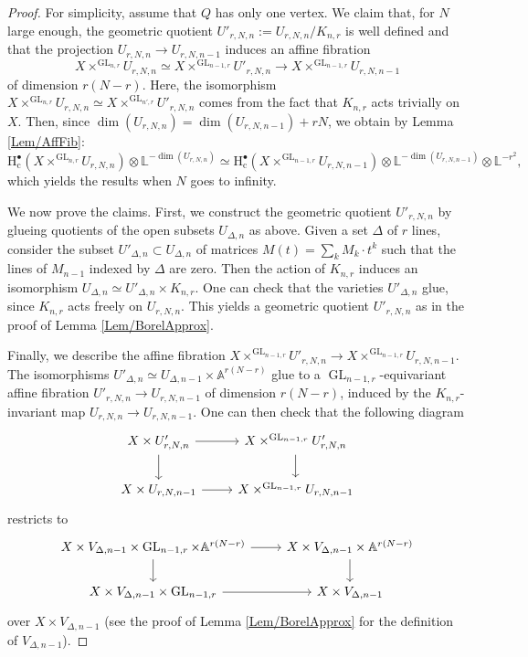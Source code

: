 \documentclass[11pt,english]{article}
\numberwithin{equation}{section}
\numberwithin{figure}{section}
\theoremstyle{definition}
\theoremstyle{plain}
\theoremstyle{remark}
\DeclareMathOperator{\GL}{GL}
\newcommand\HH{\mathrm{H}}
\begin{document}
\begin{proof}

For simplicity, assume that $Q$ has only one vertex. We claim that,
for $N$ large enough, the geometric quotient $U'_{r,N,n}:=U_{r,N,n}/K_{n,r}$
is well defined and that the projection $U_{r,N,n}\rightarrow U_{r,N,n-1}$
induces an affine fibration \[
X\times^{\GL_{n,r}}U_{r,N,n}\simeq X\times^{\GL_{n-1,r}}U'_{r,N,n}\rightarrow X\times^{\GL_{n-1,r}}U_{r,N,n-1}
\] of dimension $r(N-r)$. Here, the isomorphism $X\times^{\GL_{n,r}}U_{r,N,n}\simeq X\times^{\GL_{n',r}}U'_{r,N,n}$
comes from the fact that $K_{n,r}$ acts trivially on $X$. Then,
since $\dim(U_{r,N,n})=\dim(U_{r,N,n-1})+rN$, we obtain by Lemma
\ref{Lem/AffFib}:\[
\HH_{\mathrm{c}}^{\bullet}(X\times^{\GL_{n,r}}U_{r,N,n})
\otimes \mathbb{L}^{-\dim(U_{r,N,n})}
\simeq
\HH_{\mathrm{c}}^{\bullet}(X\times^{\GL_{n-1,r}}U_{r,N,n-1})
\otimes \mathbb{L}^{-\dim(U_{r,N,n-1})} \otimes \mathbb{L}^{-r^2},
\] which yields the results when $N$ goes to infinity.

We now prove the claims. First, we construct the geometric quotient
$U'_{r,N,n}$ by glueing quotients of the open subsets $U_{\Delta,n}$
as above. Given a set $\Delta$ of $r$ lines, consider the subset
$U'_{\Delta,n}\subset U_{\Delta,n}$ of matrices $M(t)=\sum_{k}M_{k}\cdot t^{k}$
such that the lines of $M_{n-1}$ indexed by $\Delta$ are zero. Then
the action of $K_{n,r}$ induces an isomorphism $U_{\Delta,n}\simeq U'_{\Delta,n}\times K_{n,r}$.
One can check that the varieties $U'_{\Delta,n}$ glue, since $K_{n,r}$
acts freely on $U_{r,N,n}$. This yields a geometric quotient $U'_{r,N,n}$
as in the proof of Lemma \ref{Lem/BorelApprox}.

Finally, we describe the affine fibration $X\times^{\GL_{n-1,r}}U'_{r,N,n}\rightarrow X\times^{\GL_{n-1,r}}U_{r,N,n-1}$.
The isomorphisms $U'_{\Delta,n}\simeq U_{\Delta,n-1}\times\mathbb{A}^{r(N-r)}$
glue to a $\GL_{n-1,r}$-equivariant affine fibration $U'_{r,N,n}\rightarrow U_{r,N,n-1}$
of dimension $r(N-r)$, induced by the $K_{n,r}$-invariant map $U_{r,N,n}\rightarrow U_{r,N,n-1}$.
One can then check that the following diagram \[
\begin{tikzcd}[ampersand replacement=\&]
X\times U'_{r,N,n} \ar[r]\ar[d] \& X\times^{\GL_{n-1,r}}U'_{r,N,n} \ar[d] \\
X\times U_{r,N,n-1} \ar[r] \& X\times^{\GL_{n-1,r}}U_{r,N,n-1}
\end{tikzcd}
\] restricts to \[
\begin{tikzcd}[ampersand replacement=\&]
X\times V_{\Delta,n-1}\times\GL_{n-1,r}\times\mathbb{A}^{r(N-r)}  \ar[r]\ar[d] \& X\times V_{\Delta,n-1}\times\mathbb{A}^{r(N-r)} \ar[d] \\
X\times V_{\Delta,n-1}\times\GL_{n-1,r} \ar[r] \& X\times V_{\Delta,n-1}
\end{tikzcd}
\] over $X\times V_{\Delta,n-1}$ (see the proof of Lemma \ref{Lem/BorelApprox}
for the definition of $V_{\Delta,n-1}$). \end{proof}
\end{document}
